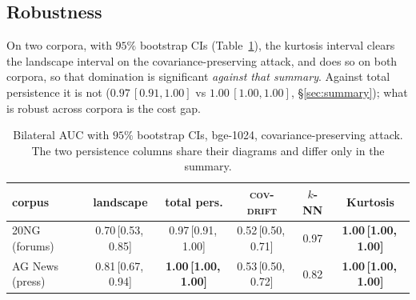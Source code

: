 \documentclass[11pt]{article}
\theoremstyle{remark}
\begin{document}
\subsection{Robustness}
On two corpora, with $95\%$ bootstrap CIs (Table~\ref{tab:robust}), the kurtosis interval clears
the landscape interval on the covariance-preserving attack, and does so on both corpora, so that
domination is
significant \emph{against that summary}. Against total persistence it is not
($0.97\,[0.91,1.00]$ vs $1.00\,[1.00,1.00]$, \S\ref{sec:summary}); what is robust across corpora is
the cost gap.

\begin{table}[t]\centering
\caption{Bilateral AUC with $95\%$ bootstrap CIs, bge-1024, covariance-preserving attack. The two persistence columns share their diagrams and differ only in the summary.}
\label{tab:robust}
\begin{tabular}{lccccc}
\toprule
corpus & landscape & total pers. & \textsc{cov-drift} & $k$-NN & Kurtosis\\
\midrule
20NG (forums)  & 0.70\,[0.53,\,0.85] & 0.97\,[0.91,\,1.00] & 0.52\,[0.50,\,0.71] & 0.97 & \textbf{1.00\,[1.00,\,1.00]}\\
AG News (press)& 0.81\,[0.67,\,0.94] & \textbf{1.00\,[1.00,\,1.00]} & 0.53\,[0.50,\,0.72] & 0.82 & \textbf{1.00\,[1.00,\,1.00]}\\
\bottomrule
\end{tabular}
\end{table}
\end{document}

